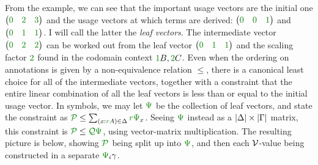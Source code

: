 From the example, we can see that the important usage vectors are the initial
one $\begin{pmatrix} \gr0 & \gr2 & \gr3 \end{pmatrix}$ and the usage vectors
at which terms are derived: $\begin{pmatrix} \gr0 & \gr0 & \gr1 \end{pmatrix}$
and $\begin{pmatrix} \gr0 & \gr1 & \gr1 \end{pmatrix}$.
I will call the latter the \emph{leaf vectors}.
The intermediate vector $\begin{pmatrix} \gr0 & \gr2 & \gr2 \end{pmatrix}$ can
be worked out from the leaf vector
$\begin{pmatrix} \gr0 & \gr1 & \gr1 \end{pmatrix}$ and the scaling factor
$\gr2$ found in the codomain context $\gr1B, \gr2C$.
Even when the ordering on annotations is given by a non-equivalence relation
$\leq$, there is a canonical least choice for all of the intermediate vectors,
together with a constraint that the entire linear combination of all the leaf
vectors is less than or equal to the initial usage vector.
In symbols, we may let $\gr\Psi$ be the collection of leaf vectors, and state
the constraint as $\grP \leq \sum_{\plr{x : \gr rA} \in \Delta} \gr r\gr\Psi_x$.
Seeing $\gr\Psi$ instead as a $\size\Delta \times \size\Gamma$ matrix, this
constraint is $\grP \leq \grQ\gr\Psi$, using vector-matrix multiplication.
The resulting picture is below, showing $\grP$ being split up into $\gr\Psi$,
and then each $\mathcal V$-value being constructed in a separate $\gr\Psi_i\gamma$.

